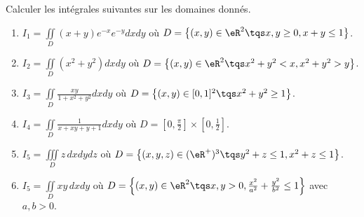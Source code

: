 \begin{exercice}\label{exoIntegralesMultiples0002}


	Calculer les intégrales suivantes sur les domaines donnés.
	\begin{enumerate}
		\item\minsyndical
$I_1 = \displaystyle \iint\limits_{D} (x + y)e^{-x}e^{-y}dxdy$ où $D  = \left\{ (x, y)\in \eR^{2}\tqs x, y\geq 0, x + y \leq 1\right\}$.
\item\minsyndical\label{ItemexoIntegralesMultiples0002ii}
$I_2 = \displaystyle \iint\limits_{D} (x^{2} + y^{2})dxdy$ où $D  = \left\{ (x, y)\in \eR^{2}\tqs x^{2} + y^{2}<x, x^{2} + y^{2}>y\right\}$.
\item\minsyndical\label{ItemexoIntegralesMultiples0002iii}
$I_3 = \displaystyle \iint\limits_{D} \frac{xy}{1 + x^{2} + y^{2}}dxdy$ où $D  = \left\{ (x, y)\in [0, 1]^{2}\tqs x^{2} + y^{2} \geq 1\right\}$.
\item\boringexo	
	$I_4 = \displaystyle \iint\limits_{D} \frac{ 1 }{ x+xy+y+1 }dxdy$ où $D  = [0, \frac{\pi}{2}]\times [0, \frac{1}{2}]$.
\item\minsyndical
$I_5 = \displaystyle \iiint\limits_{D} z\,dxdydz$ où $D  = \left\{ (x, y, z)\in (\eR^{ + })^{3}\tqs y^{2} + z \leq 1, x^{2} + z \leq 1\right\}$.
\item\boringexo
$I_5 = \displaystyle \iint\limits_{D} xy\,dxdy$ où $D  = \left\{ (x, y)\in \eR^{2}\tqs x, y>0, \frac{x^{2}}{a^{2}} + \frac{y^{2}}{b^{2}} \leq 1\right\}$ avec $a, b>0$.
			
	\end{enumerate}


\end{exercice}
